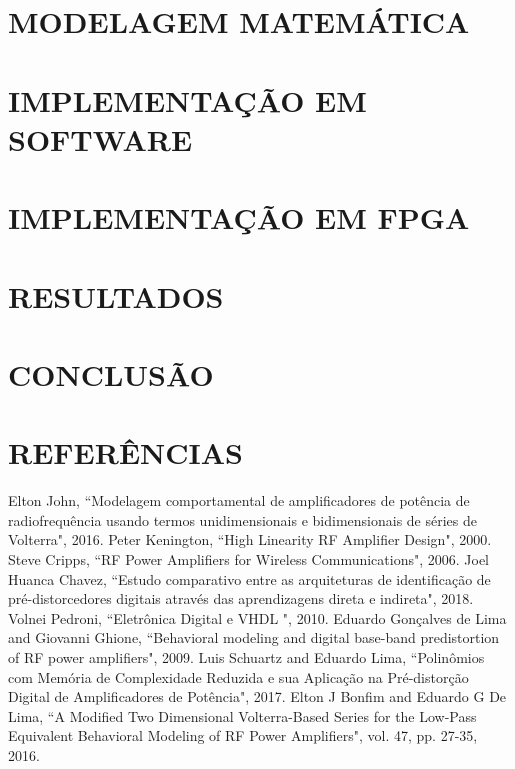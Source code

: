 \documentclass[twocolumn, a4paper]{article}
\begin{document}
\section{MODELAGEM MATEMÁTICA}


\section{IMPLEMENTAÇÃO EM SOFTWARE} \label{sec:implsoft}


\section{IMPLEMENTAÇÃO EM FPGA}


\section{RESULTADOS}


\section{CONCLUSÃO}


\section*{REFERÊNCIAS}
\begingroup
\renewcommand{\section}[2]{}%

\begin{thebibliography}{}
	 Elton John, ``Modelagem comportamental de amplificadores de potência de radiofrequência usando termos unidimensionais e bidimensionais de séries de Volterra", 2016.
	 Peter Kenington, ``High Linearity RF Amplifier Design", 2000.
	 Steve Cripps, ``RF Power Amplifiers for Wireless Communications", 2006.
	 Joel Huanca Chavez, ``Estudo comparativo entre as arquiteturas de identificação de pré-distorcedores digitais através das aprendizagens direta e indireta", 2018.
	 Volnei Pedroni, ``Eletrônica Digital e VHDL ", 2010.
	 Eduardo Gonçalves de Lima and Giovanni Ghione, ``Behavioral modeling and digital base-band predistortion of RF power amplifiers", 2009.
	 Luis Schuartz and Eduardo Lima, ``Polinômios com Memória de Complexidade Reduzida e sua Aplicação na Pré-distorção Digital de Amplificadores de Potência", 2017.
	 Elton J Bonfim and Eduardo G De Lima, ``A Modified Two Dimensional Volterra-Based Series for the Low-Pass Equivalent Behavioral Modeling of RF Power Amplifiers", vol. 47, pp. 27-35, 2016.
\end{thebibliography}




\endgroup
\end{document}
